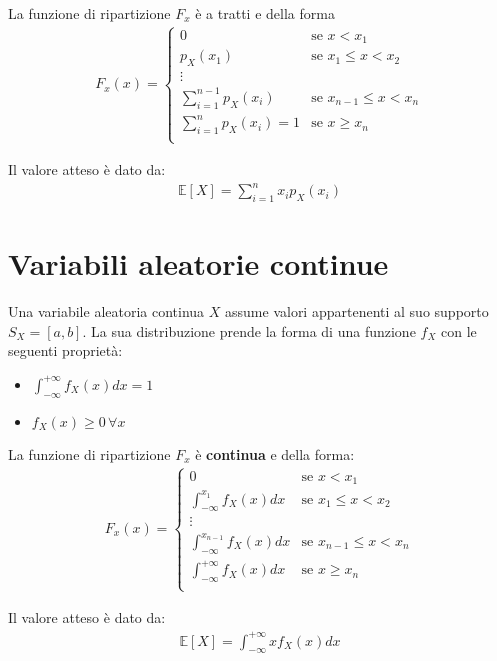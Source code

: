 \documentclass{article}
\begin{document}
La funzione di ripartizione $F_x$ \`e a tratti e della forma
\begin{align*}
F_x(x) = \begin{cases}
0 &\text{se } x < x_1 \\
p_X(x_1) &\text{se } x_1 \leq x < x_2 \\
\vdots \\
\sum_{i=1}^{n-1} p_X(x_i) &\text{se } x_{n-1} \leq x < x_{n} \\
\sum_{i=1}^n p_X(x_i) = 1 &\text{se } x \geq x_n \\
\end{cases}
\end{align*}

Il valore atteso \`e dato da:
\begin{align*}
\mathbb{E}[X] = \sum_{i=1}^n x_i p_X(x_i)
\end{align*}

\section{Variabili aleatorie continue}

Una variabile aleatoria continua $X$ assume valori appartenenti al suo supporto $S_X = [a, b]$.
La sua distribuzione prende la forma di una funzione $f_X$ con le seguenti propriet\`a:
\begin{itemize}
\item $\int_{-\infty}^{+\infty}f_X(x) dx = 1$
\item $f_X(x) \geq 0 \, \forall x$
\end{itemize}

La funzione di ripartizione $F_x$ \`e \textbf{continua} e della forma:
\begin{align*}
F_x(x) = \begin{cases}
0 &\text{se } x < x_1 \\
\int_{-\infty}^{x_1}f_X(x) dx &\text{se } x_1 \leq x < x_2 \\
\vdots \\
\int_{-\infty}^{x_{n-1}}f_X(x) dx &\text{se } x_{n-1} \leq x < x_n \\
\int_{-\infty}^{+\infty}f_X(x) dx &\text{se } x \geq x_n \\
\end{cases}
\end{align*}

Il valore atteso \`e dato da:
\begin{align*}
\mathbb{E}[X] = \int_{-\infty}^{+\infty} x f_X(x) dx
\end{align*}
\end{document}
